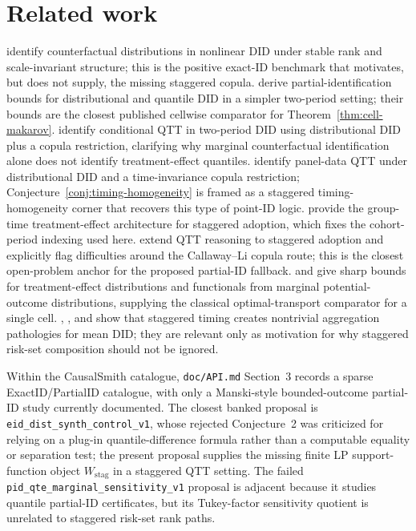 \documentclass[11pt]{article}
\theoremstyle{definition}
\theoremstyle{plain}
\theoremstyle{remark}
\begin{document}
\section{Related work}
\citet{AtheyImbens2006} identify counterfactual distributions in nonlinear DID under stable rank and scale-invariant structure; this is the positive exact-ID benchmark that motivates, but does not supply, the missing staggered copula.  \citet{FanYu2012} derive partial-identification bounds for distributional and quantile DID in a simpler two-period setting; their bounds are the closest published cellwise comparator for Theorem~\ref{thm:cell-makarov}.  \citet{CallawayLiOka2018} identify conditional QTT in two-period DID using distributional DID plus a copula restriction, clarifying why marginal counterfactual identification alone does not identify treatment-effect quantiles.  \citet{CallawayLi2019} identify panel-data QTT under distributional DID and a time-invariance copula restriction; Conjecture~\ref{conj:timing-homogeneity} is framed as a staggered timing-homogeneity corner that recovers this type of point-ID logic.  \citet{CallawaySantAnna2021} provide the group-time treatment-effect architecture for staggered adoption, which fixes the cohort-period indexing used here.  \citet{LiLin2024} extend QTT reasoning to staggered adoption and explicitly flag difficulties around the Callaway--Li copula route; this is the closest open-problem anchor for the proposed partial-ID fallback.  \citet{FanPark2010} and \citet{FirpoRidder2019} give sharp bounds for treatment-effect distributions and functionals from marginal potential-outcome distributions, supplying the classical optimal-transport comparator for a single cell.  \citet{GoodmanBacon2021}, \citet{SunAbraham2021}, and \citet{deChaisemartinDHaultfoeuille2020} show that staggered timing creates nontrivial aggregation pathologies for mean DID; they are relevant only as motivation for why staggered risk-set composition should not be ignored.

Within the CausalSmith catalogue, \texttt{doc/API.md} Section~3 records a sparse ExactID/PartialID catalogue, with only a Manski-style bounded-outcome partial-ID study currently documented.  The closest banked proposal is \texttt{eid\_dist\_synth\_control\_v1}, whose rejected Conjecture~2 was criticized for relying on a plug-in quantile-difference formula rather than a computable equality or separation test; the present proposal supplies the missing finite LP support-function object \(W_{\mathrm{stag}}\) in a staggered QTT setting.  The failed \texttt{pid\_qte\_marginal\_sensitivity\_v1} proposal is adjacent because it studies quantile partial-ID certificates, but its Tukey-factor sensitivity quotient is unrelated to staggered risk-set rank paths.
\end{document}
